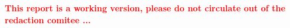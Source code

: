 \documentclass[12pt]{article}
\begin{document}


\newpage

\newpage %



\textcolor{red}{\textbf{This report is a working version, please do not circulate out of the redaction comitee  ...}} \\
























\end{document}

